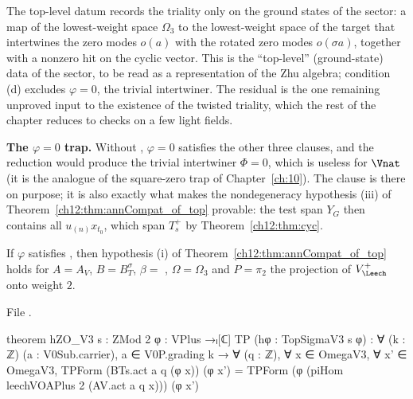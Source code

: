 \begin{physics}
The top-level datum records the triality only on the ground states of the sector: a map of the lowest-weight space $\Omega_3$ to the lowest-weight space of the target that intertwines the zero modes $o(a)$ with the rotated zero modes $o(\sigma a)$, together with a nonzero hit on the cyclic vector. This is the ``top-level'' (ground-state) data of the sector, to be read as a representation of the Zhu algebra; condition (d) excludes $\varphi=0$, the trivial intertwiner. The residual is the one remaining unproved input to the existence of the twisted triality, which the rest of the chapter reduces to checks on a few light fields.
\end{physics}

\begin{warning}
\textbf{The $\varphi=0$ trap.}  Without , $\varphi=0$ satisfies the other three
clauses, and the reduction would produce the trivial intertwiner $\Phi=0$, which is useless for
$\Vnat$ (it is the analogue of the square-zero trap of Chapter~\ref{ch:10}).  The clause is
there on purpose; it is also exactly what makes the nondegeneracy hypothesis (iii) of
Theorem~\ref{ch12:thm:annCompat_of_top} provable: the test span $Y_G$ then contains all
$u_{(n)}x_{t_0}$, which span $T_s^+$ by Theorem~\ref{ch12:thm:cyc}.
\end{warning}

\begin{lemma}\label{ch12:lem:hZO}
If $\varphi$ satisfies , then hypothesis (i) of Theorem~\ref{ch12:thm:annCompat_of_top}
holds for $A=A_V$, $B=B_T^\sigma$, $\beta=$ , $\Omega=\Omega_3$ and $P=\pi_2$ the projection of
$V_\Leech^+$ onto weight $2$.
\end{lemma}
File .
\begin{leancode}
theorem hZO_V3 {s : ZMod 2} {φ : VPlus →ₗ[ℂ] TP} (hφ : TopSigmaV3 s φ) :
    ∀ (k : ℤ) (a : V0Sub.carrier), a ∈ V0P.grading k → ∀ (q : ℤ), ∀ x ∈ OmegaV3, ∀ x' ∈ OmegaV3,
      TPForm (BTs.act a q (φ x)) (φ x')
        = TPForm (φ (piHom leechVOAPlus 2 (AV.act a q x))) (φ x')
\end{leancode}

